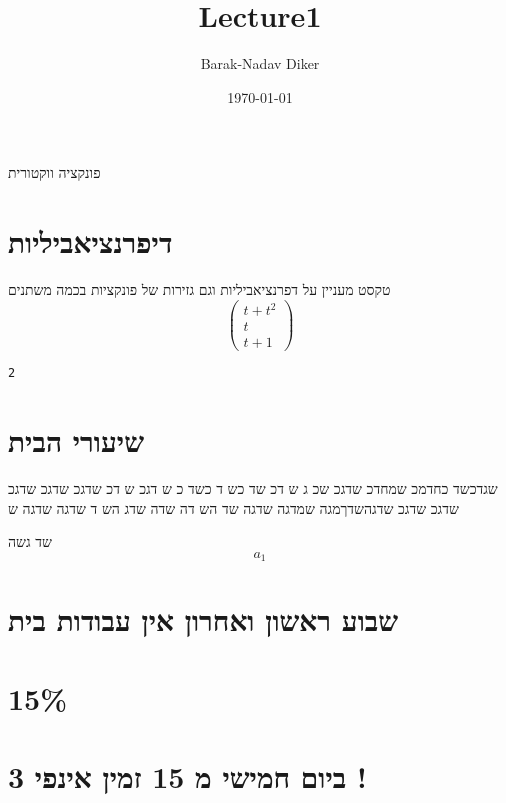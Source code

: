 \documentclass[11pt]{article}
\author{Barak-Nadav Diker}
\date{\today}
\title{Lecture1}
\begin{document}
\maketitle
פונקציה ווקטורית
\section*{דיפרנציאביליות}
\label{sec:org521d065}
טקסט מעניין על דפרנציאביליות וגם גזירות של פונקציות בכמה משתנים
\begin{equation}
\begin{pmatrix}
t + t^2 \\
t \\
t + 1 
\end{pmatrix}
\end{equation}


\label{}
\begin{verbatim}
2
\end{verbatim}
\section*{שיעורי הבית}
\label{sec:org48b9a4b}
שגדכשד כחדמכ שמחדכ שדגכ שכ
ג ש
דכ שד כש
ד כשד
כ ש
דגכ ש
דכ
שדגכ שדגכ שדגכ שדגכ שדגכ שדגהשדךמגה שמדגה שדגה שד
הש
דה שדה שדג הש
ד
שדגה שדגה ש

שד גשה
\begin{equation}
a_1
\end{equation}
\section*{שבוע ראשון ואחרון אין עבודות בית}
\label{sec:org575116e}
\section*{15\%}
\label{sec:org67c5a01}
\section*{ביום חמישי מ 15 זמין אינפי 3 !}
\label{sec:org5af13a2}
\end{document}
